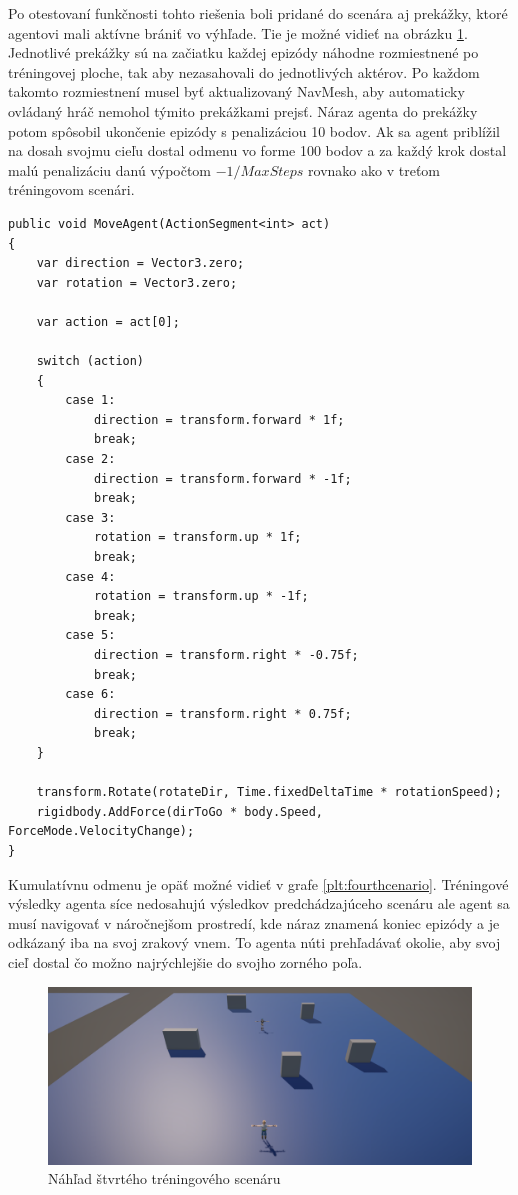 \documentclass[slovak, master]{diploma}
\begin{document}
Po otestovaní funkčnosti tohto riešenia boli pridané do scenára aj prekážky, ktoré agentovi mali aktívne brániť vo výhľade. Tie je možné vidieť na obrázku \ref{pic:fourthScenario}. Jednotlivé prekážky sú na začiatku každej epizódy náhodne rozmiestnené po tréningovej ploche, tak aby nezasahovali do jednotlivých aktérov. Po každom takomto rozmiestnení musel byť aktualizovaný NavMesh, aby automaticky ovládaný hráč nemohol týmito prekážkami prejsť. Náraz agenta do prekážky potom spôsobil ukončenie epizódy s penalizáciou 10 bodov. Ak sa agent priblížil na dosah svojmu cieľu dostal odmenu vo forme 100 bodov a za každý krok dostal malú penalizáciu danú výpočtom \(-1 / MaxSteps\) rovnako ako v treťom tréningovom scenári.

\vspace{8pt}
\begin{lstlisting}[label=src:MoveAgent,caption={Mapovanie diskrétnej akcie na pohyb a rotáciu agenta}]
public void MoveAgent(ActionSegment<int> act)
{
    var direction = Vector3.zero;
    var rotation = Vector3.zero;

    var action = act[0];

    switch (action)
    {
        case 1:
            direction = transform.forward * 1f;
            break;
        case 2:
            direction = transform.forward * -1f;
            break;
        case 3:
            rotation = transform.up * 1f;
            break;
        case 4:
            rotation = transform.up * -1f;
            break;
        case 5:
            direction = transform.right * -0.75f;
            break;
        case 6:
            direction = transform.right * 0.75f;
            break;
    }

    transform.Rotate(rotateDir, Time.fixedDeltaTime * rotationSpeed);
    rigidbody.AddForce(dirToGo * body.Speed, ForceMode.VelocityChange);
}
\end{lstlisting}

Kumulatívnu odmenu je opäť možné vidieť v grafe \ref{plt:fourthcenario}. Tréningové výsledky agenta síce nedosahujú výsledkov predchádzajúceho scenáru ale agent sa musí navigovať v náročnejšom prostredí, kde náraz znamená koniec epizódy a je odkázaný iba na svoj zrakový vnem. To agenta núti prehľadávať okolie, aby svoj cieľ dostal čo možno najrýchlejšie do svojho zorného poľa. 

\begin{figure}[!htbp]
    \centering
    \includegraphics[width=1\textwidth]{Figures/scenar4.png}
    \caption{Náhľad štvrtého tréningového scenáru}
    \label{pic:fourthScenario}
\end{figure}
\end{document}
